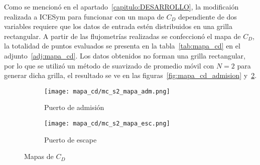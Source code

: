 



Como se mencionó en el apartado~\ref{capitulo:DESARROLLO}, la modificaión
realizada a ICESym para funcionar con un mapa de $C_{D}$ dependiente de dos
variables requiere que los datos de entrada estén distribuidos en una grilla
rectangular.
%
A partir de las flujometrías realizadas se confeccionó el mapa de $C_{D}$, la
totalidad de puntos evaluados se presenta en la tabla~\ref{tab:mapa_cd} en el
adjunto~\ref{adj:mapa_cd}.
%
Los datos obtenidos no forman una grilla rectangular, por lo que se utilizó
un método de suavizado de promedio móvil con $N=2$ para generar dicha grilla, el
resultado se ve en las figuras~\ref{fig:mapa_cd_admision}
y~\ref{fig:mapa_cd_escape}.

\begin{figure}[ht!]
    \centering
    \begin{subfigure}{0.7\textwidth}
        \centering
        \texttt{[image: mapa\_cd/mc\_s2\_mapa\_adm.png]}
        \caption{Puerto de admisión}\label{fig:mapa_cd_admisión}
    \end{subfigure}
    \hfill
    \begin{subfigure}{0.7\textwidth}
        \centering
        \texttt{[image: mapa\_cd/mc\_s2\_mapa\_esc.png]}
        \caption{Puerto de escape}\label{fig:mapa_cd_escape}
    \end{subfigure}
    \caption{Mapas de $C_{D}$}\label{fig:mapa_cd_mc_s2}
\end{figure}

